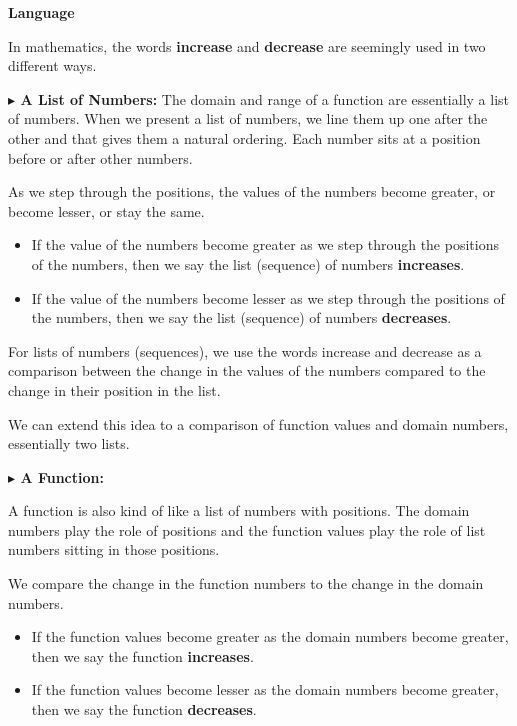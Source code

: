 \documentclass{ximera}
\begin{document}
\begin{warning} \textbf{\textcolor{red!70!black}{Language}}

In mathematics, the words \textbf{increase} and \textbf{decrease} are seemingly used in two different ways. 


\textbf{\textcolor{blue!55!black}{$\blacktriangleright$ A List of Numbers:}} The domain and range of a function are essentially a list of numbers. When we present a list of numbers, we line them up one after the other and that gives them a natural ordering.  Each number sits at a position before or after other numbers. 

As we step through the positions, the values of the numbers become greater, or become lesser, or stay the same. 

\begin{itemize}
    \item If the value of the numbers become greater as we step through the positions of the numbers, then we say the list (sequence) of numbers \textbf{increases}.  
    \item If the value of the numbers become lesser as we step through the positions of the numbers, then we say the list (sequence) of numbers \textbf{decreases}. 
\end{itemize}


For lists of numbers (sequences), we use the words increase and decrease as a comparison between the change in the values of the numbers compared to the change in their position in the list. 


We can extend this idea to a comparison of function values and domain numbers, essentially two lists. 

\textbf{\textcolor{blue!55!black}{$\blacktriangleright$ A Function:}} 

A function is also kind of like a list of numbers with positions.  The domain numbers play the role of positions and the function values play the role of list numbers sitting in those positions. 

We compare the change in the function numbers to the change in the domain numbers. 

\begin{itemize}
    \item If the function values become greater as the domain numbers become greater, then we say the function \textbf{increases}.  
    \item If the function values become lesser as the domain numbers become greater, then we say the function \textbf{decreases}.  
\end{itemize}


\end{warning}
\end{document}
